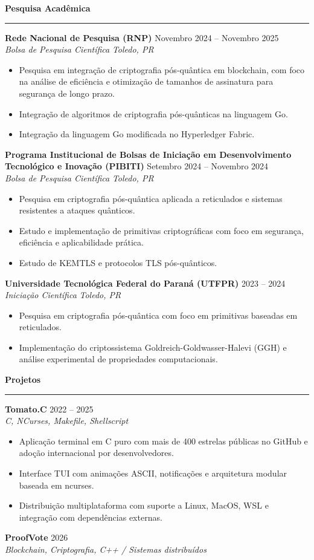 \documentclass[letterpaper,11pt]{article}
\newcommand{\cvsection}[2][6pt]{
\vspace{#1}
{\large\bfseries\color{cvblue} #2}\\[-6pt]
{\color{cvblue}\rule{\textwidth}{0.4pt}}
\vspace{-6pt}
}
\newcommand{\cvtitle}[2]{
\textbf{#1} \hfill {\color{cvgray}#2}
}
\newcommand{\cvsubtitle}[2]{
\textit{\color{cvgray}#1} \hfill \textit{\color{cvgray}#2}
}
\newcommand{\cventry}[4]{
\cvtitle{#1}{#2}\\
\cvsubtitle{#3}{#4}
\vspace{2pt}
}
\newcommand{\cvbullet}[1]{
\item #1
}
\newcommand{\cvliststart}{
\begin{itemize}
}
\newcommand{\cvlistend}{
\end{itemize}
}
\begin{document}
\cvsection{Pesquisa Acadêmica}

\cventry
{Rede Nacional de Pesquisa (RNP)}
{Novembro 2024 -- Novembro 2025}
{Bolsa de Pesquisa Científica}
{Toledo, PR}

\cvliststart
\cvbullet{Pesquisa em integração de criptografia pós-quântica em blockchain,
com foco na análise de eficiência e otimização de tamanhos de assinatura para
segurança de longo prazo.}
\cvbullet{Integração de algoritmos de criptografia pós-quânticas na linguagem Go.}
\cvbullet{Integração da linguagem Go modificada no Hyperledger Fabric.}
\cvlistend

\cventry
{Programa Institucional de Bolsas de Iniciação em Desenvolvimento Tecnológico e Inovação (PIBITI)}
{Setembro 2024 -- Novembro 2024}
{Bolsa de Pesquisa Científica}
{Toledo, PR}

\cvliststart
\cvbullet{Pesquisa em criptografia pós-quântica aplicada a reticulados e sistemas resistentes a ataques quânticos.}
\cvbullet{Estudo e implementação de primitivas criptográficas com foco em segurança, eficiência e aplicabilidade prática.}
\cvbullet{Estudo de KEMTLS e protocolos TLS pós-quânticos.}
\cvlistend

\cventry
{Universidade Tecnológica Federal do Paraná (UTFPR)}
{2023 -- 2024}
{Iniciação Científica}
{Toledo, PR}

\cvliststart
\cvbullet{Pesquisa em criptografia pós-quântica com foco em primitivas baseadas em reticulados.}
\cvbullet{Implementação do criptossistema Goldreich-Goldwasser-Halevi (GGH) e análise experimental de propriedades computacionais.}
\cvlistend

\newpage
\cvsection{Projetos}

\cventry
{Tomato.C}
{2022 -- 2025}
{C, NCurses, Makefile, Shellscript}
{}

\cvliststart
\cvbullet{Aplicação terminal em C puro com mais de 400 estrelas públicas no GitHub e adoção internacional por desenvolvedores.}
\cvbullet{Interface TUI com animações ASCII, notificações e arquitetura modular baseada em ncurses.}
\cvbullet{Distribuição multiplataforma com suporte a Linux, MacOS, WSL e integração com dependências externas.}
\cvlistend

\cventry
{ProofVote}
{2026}
{Blockchain, Criptografia, C++ / Sistemas distribuídos}
{}
\end{document}
